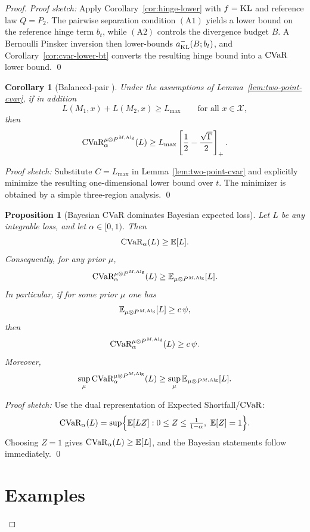 \documentclass[conference]{IEEEtran}
\newtheorem{proposition}{Proposition}
\newtheorem{corollary}{Corollary}
\begin{document}
\begin{proof}[Proof]
\textit{Proof sketch:}
Apply Corollary~\ref{cor:hinge-lower} with \(f=\textup{KL}\) and reference law \(Q=P_2\). The pairwise separation condition \((\mathrm{A1})\) yields a lower bound on the reference hinge term \(b_t\), while \((\mathrm{A2})\) controls the divergence budget \(B\). A Bernoulli Pinsker inversion then lower-bounds \(a_{\textup{KL}}^{-}(B;b_t)\), and Corollary~\ref{cor:cvar-lower-bt} converts the resulting hinge bound into a \(\textup{CVaR}\) lower bound. \qed

\begin{corollary}[Balanced-pair ]
\label{cor:balanced-two-point-cvar}
Under the assumptions of Lemma~\ref{lem:two-point-cvar}, if in addition
\[
L(M_1,x)+L(M_2,x)\ge L_{\max}
\qquad
\text{for all }x\in\mathcal{X},
\tag{A3}
\]
then
\[
\textup{CVaR}_\alpha^{\mu\otimes P^{M,\textup{Alg}}}(L)
\ge
L_{\max}\left[\frac12-\frac{\sqrt{\Gamma}}{2}\right]_+.
\]
\end{corollary}

\textit{Proof sketch:}
Substitute \(C=L_{\max}\) in Lemma~\ref{lem:two-point-cvar} and explicitly minimize the resulting one-dimensional lower bound over \(t\). The minimizer is obtained by a simple three-region analysis. \qed

\begin{proposition}[Bayesian \textup{CVaR} dominates Bayesian expected loss]
\label{prop:cvar-dominates-bayes-risk}
Let \(L\) be any integrable loss, and let \(\alpha\in[0,1)\). Then
\[
\textup{CVaR}_\alpha(L)\ge \mathbb{E}[L].
\]
Consequently, for any prior \(\mu\),
\[
\textup{CVaR}_\alpha^{\mu\otimes P^{M,\textup{Alg}}}(L)
\ge
\mathbb{E}_{\mu\otimes P^{M,\textup{Alg}}}[L].
\]
In particular, if for some prior \(\mu\) one has
\[
\mathbb{E}_{\mu\otimes P^{M,\textup{Alg}}}[L]\ge c\,\psi,
\]
then
\[
\textup{CVaR}_\alpha^{\mu\otimes P^{M,\textup{Alg}}}(L)\ge c\,\psi.
\]
Moreover,
\[
\sup_{\mu}\textup{CVaR}_\alpha^{\mu\otimes P^{M,\textup{Alg}}}(L)
\ge
\sup_{\mu}\mathbb{E}_{\mu\otimes P^{M,\textup{Alg}}}[L].
\]
\end{proposition}

\textit{Proof sketch:}
Use the dual representation of Expected Shortfall/\(\textup{CVaR}\):
\[
\textup{CVaR}_\alpha(L)
=
\sup\Bigl\{
\mathbb{E}[LZ]:
0\le Z\le \tfrac{1}{1-\alpha},\ \mathbb{E}[Z]=1
\Bigr\}.
\]
Choosing \(Z= 1\) gives \(\textup{CVaR}_\alpha(L)\ge \mathbb{E}[L]\), and the Bayesian statements follow immediately. \qed

\section{Examples}


\end{proof}
\end{document}
